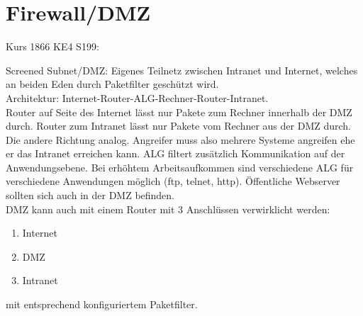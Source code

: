 \section*{Firewall/DMZ}

Kurs 1866 KE4  S199: 

Screened Subnet/DMZ: Eigenes Teilnetz zwischen Intranet und Internet, welches an beiden Eden durch Paketfilter geschützt wird. \\
Architektur: Internet-Router-ALG-Rechner-Router-Intranet.\\
Router auf Seite des Internet lässt nur Pakete zum Rechner innerhalb der DMZ durch. Router zum Intranet lässt nur Pakete vom Rechner aus der DMZ durch. Die andere Richtung analog. Angreifer muss also mehrere Systeme angreifen ehe er das Intranet erreichen kann. ALG filtert zusätzlich Kommunikation auf der Anwendungsebene. Bei erhöhtem Arbeitsaufkommen sind verschiedene ALG für verschiedene Anwendungen möglich (ftp, telnet, http). Öffentliche Webserver sollten sich auch in der DMZ befinden.\\
DMZ kann auch mit einem Router mit 3 Anschlüssen verwirklicht werden: \begin{enumerate}
  \item Internet
  \item DMZ
  \item Intranet
\end{enumerate}
mit entsprechend konfiguriertem Paketfilter.
